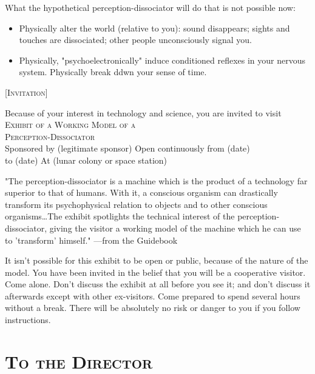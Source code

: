 \documentclass[10pt,twoside]{memoir}
\begin{document}
\begin{enumerate}
{\begin{enumerate}
\begin{sysrules}
\begin{sysrules}
\begin{sysrules}
\begin{sysrules}
{\begin{enumerate}
\begin{sysrules}
\begin{sysrules}
What the hypothetical perception-dissociator will do that is not 
possible now: 
\end{sysrules}

\begin{itemize}
\item Physically alter the world (relative to you): sound disappears; sights and 
touches are dissociated; other people unconsciously signal you. 

\item Physically, "psychoelectronically" induce conditioned reflexes in your 
nervous system. Physically break ddwn your sense of time. 
\end{itemize}

{ \centering
	\large
	[\textsc{Invitation}] \par}

{ \centering 
Because of your interest in technology and science, you are invited to visit \\
	\textsc{Exhibit of a Working Model of a} \\
	\textsc{Perception-Dissociator} \\
Sponsored by (legitimate sponsor) Open continuously from (date) \\
to (date) At (lunar colony or space station) \par
	}

"The perception-dissociator is a machine which is the product of a 
technology far superior to that of humans. With it, a conscious organism can 
drastically transform its psychophysical relation to objects and to other 
conscious organisms\ldots The exhibit spotlights the technical interest of the 
perception-dissociator, giving the visitor a working model of the machine 
which he can use to 'transform' himself." ---from the Guidebook 

It isn't possible for this exhibit to be open or public, because of the nature of 
the model. You have been invited in the belief that you will be a cooperative 
visitor. Come alone. Don't discuss the exhibit at all before you see it; and 
don't discuss it afterwards except with other ex-visitors. Come prepared to 
spend several hours without a break. There will be absolutely no risk or 
danger to you if you follow instructions. 


\section*{\textsc{To the Director}}



\end{sysrules}
\end{enumerate}}
\end{sysrules}
\end{sysrules}
\end{sysrules}
\end{sysrules}
\end{enumerate}}
\end{enumerate}
\end{document}
